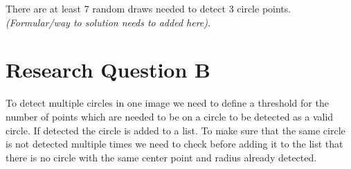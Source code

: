 There are at least 7 random draws needed to detect 3 circle points.
{\it (Formular/way to solution needs to added here)}.

\section{Research Question B}

To detect multiple circles in one image we need to define a threshold for the number of points which are needed to be on a circle to be detected as a valid circle. If detected the circle is added to a list. To make sure that the same circle is not detected multiple times we need to check before adding it to the list that there is no circle with the same center point and radius already detected.